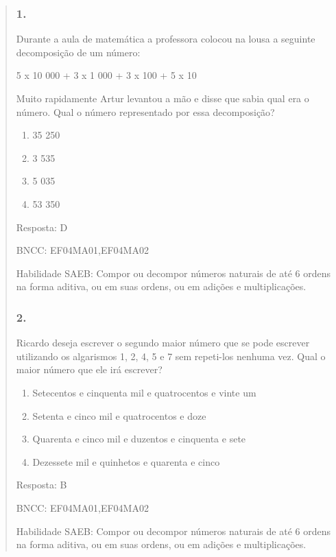\begin{enumerate}
\begin{escolha}
\begin{enumerate}
\begin{itemize}
\begin{itemize}
\begin{escolha}
\begin{quote}
\begin{escolha}
{\subsubsection{1.}\label{section-172}

Durante a aula de matemática a professora colocou na lousa a seguinte
decomposição de um número:

5 x 10 000 + 3 x 1 000 + 3 x 100 + 5 x 10

Muito rapidamente Artur levantou a mão e disse que sabia qual era o
número. Qual o número representado por essa decomposição?

\begin{enumerate}
\def\labelenumi{\alph{enumi})}
\item
  35 250
\item
  3 535
\item
  5 035
\item
  53 350
\end{enumerate}

Resposta: D

BNCC: EF04MA01,EF04MA02

Habilidade SAEB: Compor ou decompor números naturais de até 6 ordens na
forma aditiva, ou em suas ordens, ou em adições e multiplicações.

\subsubsection{2.}\label{section-173}

Ricardo deseja escrever o segundo maior número que se pode escrever
utilizando os algarismos 1, 2, 4, 5 e 7 sem repeti-los nenhuma vez. Qual
o maior número que ele irá escrever?

\begin{enumerate}
\def\labelenumi{\alph{enumi})}
\item
  Setecentos e cinquenta mil e quatrocentos e vinte um
\item
  Setenta e cinco mil e quatrocentos e doze
\item
  Quarenta e cinco mil e duzentos e cinquenta e sete
\item
  Dezessete mil e quinhetos e quarenta e cinco
\end{enumerate}

Resposta: B

BNCC: EF04MA01,EF04MA02

Habilidade SAEB: Compor ou decompor números naturais de até 6 ordens na
forma aditiva, ou em suas ordens, ou em adições e multiplicações.

}
\end{escolha}
\end{quote}
\end{escolha}
\end{itemize}
\end{itemize}
\end{enumerate}
\end{escolha}
\end{enumerate}

